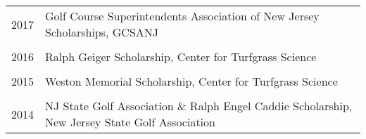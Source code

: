 \documentclass[letterpaper,11pt, english]{article}
\makeatletter
\newcommand{\resumeOrganizationHeading}[4]{
  \vspace{-2pt}\item
    \begin{tabular*}{0.97\textwidth}[t]{l@{\extracolsep{\fill}}r}
      \textbf{#1} & \textit{\small #2} \\
      \textit{\small#3}
    \end{tabular*}\vspace{-7pt}
}
\newcommand{\resumeSubHeadingListStart}{\begin{itemize}[leftmargin=0.15in, label={}]}
\newcommand{\resumeSubHeadingListEnd}{\end{itemize}}
\makeatother
\begin{document}
\begin{flushleft}
\begin{tabularx}{\textwidth}{@{}lX@{}}
    2017 \hspace{1cm} & Golf Course Superintendents Association of New Jersey Scholarships, GCSANJ \\
    \\[-0.2cm] 
    2016 \hspace{1cm} & Ralph Geiger Scholarship, Center for Turfgrass Science \\
    \\[-0.2cm] 
    2015 \hspace{1cm} & Weston Memorial Scholarship, Center for Turfgrass Science \\
    \\[-0.2cm] 
    2014 \hspace{1cm} & NJ State Golf Association \& Ralph Engel Caddie Scholarship, New Jersey State Golf Association \\
  \end{tabularx}
\end{flushleft}
  



    
    




    
    




\end{document}
